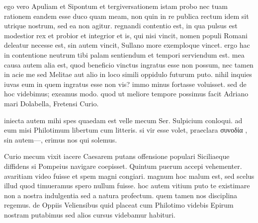 


 ego vero Apuliam et Sipontum et tergiversationem istam probo nec tuam rationem eandem esse duco quam meam, non quin in re publica rectum idem sit utrique nostrum, sed ea non agitur. regnandi contentio est, in qua pulsus est modestior rex et probior et integrior et is, qui nisi vincit, nomen populi Romani deleatur necesse est, sin autem vincit, Sullano more exemploque vincet. ergo hac in contentione neutrum tibi palam sentiendum et tempori serviendum est. mea causa autem alia est, quod beneficio vinctus ingratus esse non possum, nec tamen in acie me sed Melitae aut alio in loco simili oppidulo futurum puto. nihil inquies iuvas eum in quem ingratus esse non vis? immo minus fortasse voluisset. sed de hoc videbimus; exeamus modo. quod ut meliore tempore possimus facit Adriano mari Dolabella, Fretensi Curio.

 iniecta autem mihi spes quaedam est velle mecum Ser. Sulpicium conloqui. ad eum misi Philotimum libertum cum litteris. si vir esse volet, praeclara συνοδία , sin autem—, erimus nos qui solemus.

 Curio mecum vixit iacere Caesarem putans offensione populari Siciliaeque diffidens si Pompeius navigare coepisset. Quintum puerum accepi vehementer. avaritiam video fuisse et spem magni congiari. magnum hoc malum est, sed scelus illud quod timueramus spero nullum fuisse. hoc autem vitium puto te existimare non a nostra indulgentia sed a natura profectum. quem tamen nos disciplina regemus. de Oppiis Veliensibus quid placeat cum Philotimo videbis Epirum nostram putabimus sed alios cursus videbamur habituri.
